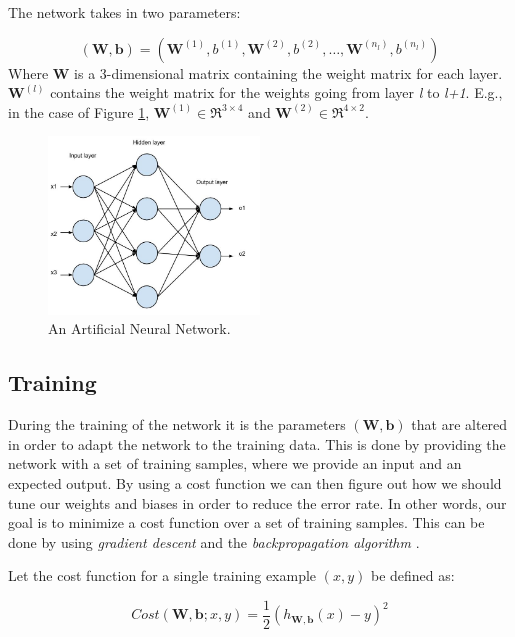 The network takes in two parameters: 

\begin{equation}
	(\mathbf{W, b}) = (\mathbf{W}^{(1)}, b^{(1)}, \mathbf{W}^{(2)}, b^{(2)}, \dots , \mathbf{W}^{(n_l)}, b^{(n_l)})	
\end{equation}
 Where \textbf{W} is a 3-dimensional matrix containing the weight matrix for each layer. $ \mathbf{W}^{(l)} $ contains the weight matrix for the weights going from layer \textit{l} to \textit{l+1}. E.g., in the case of Figure \ref{fig_ann}, $ \mathbf{W}^{(1)} \in \Re ^{3 \times 4}$ and $ \mathbf{W}^{(2)} \in \Re ^{4 \times 2}$.

\begin{figure}[h!]
  \centering
      \includegraphics[width=0.5\textwidth]{Figures/Background/ann}
  \caption{An Artificial Neural Network.}
  \label{fig_ann}
\end{figure}


\subsection{Training} \label{sec_ann_training}
During the training of the network it is the parameters $ (\mathbf{W, b}) $ that are altered in order to adapt the network to the training data. This is done by providing the network with a set of training samples, where we provide an input and an expected output. By using a cost function we can then figure out how we should tune our weights and biases in order to reduce the error rate. In other words, our goal is to minimize a cost function over a set of training samples. This can be done by using \textit{gradient descent} and the \textit{backpropagation algorithm} \cite{Rumelhart1986}\cite{Leonard1990}\cite{LeCun1998}. 

Let the cost function for a single training example $(x,y)$ be defined as:

\begin{equation}
	Cost(\mathbf{W},\mathbf{b}; x, y) = \frac{1}{2}(h_{\mathbf{W},\mathbf{b}}(x) - y)^2
\end{equation}

